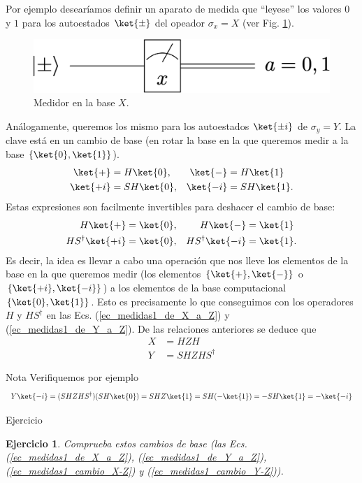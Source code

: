 \documentclass[a4paper,11pt]{book} %
\newtheorem{ejercicio_contador}{Ejercicio}
\newcommand{\Ejercicio}[1]{
		\begin{mybox_gray}{Ejercicio} 
			\begin{ejercicio_contador}
				 #1 
			\end{ejercicio_contador} 
		\end{mybox_gray}
	}
\numberwithin{equation}{chapter}
\def\lch{\left\{}
\def\rch{\right\}}
\begin{document}
Por ejemplo desearíamos definir un aparato de medida que ``leyese'' los valores $0$ y $1$ para los autoestados $\ket{\pm}$ del opeador $\sigma_x =  X$ (ver Fig. \ref{Fig_medidas1_meter_xbasis2}).
	\begin{figure}[H]
	\centering 
	\includegraphics[width=0.3\linewidth]{Figuras/Fig_medidas1_meter_xbasis2}
	\caption{Medidor en la base $X$.}
	\label{Fig_medidas1_meter_xbasis2}
	\end{figure}
Análogamente, queremos los mismo para los autoestados $\ket{\pm i}$ de $\sigma_y = Y$. La clave está en un cambio de base (en rotar la base en la que queremos medir a la base $\lch \ket{0}, \ket{1} \rch$). 
\begin{align}
\ket{+}  &= H\ket{0}  ,&  \ket{-}  &= H\ket{1}    \\ 
\ket{+i}  &= SH \ket{0}    ,&  \ket{-i}  &= SH\ket{1}   .
\end{align}
Estas expresiones son facilmente invertibles para deshacer el cambio de base:
\begin{align}
H \ket{+}  &= \ket{0}                ,&  H\ket{-}  & = \ket{1}   \label{ec_medidas1_de_X_a_Z} \\ 
H S^\dagger \ket{+i}  &=  \ket{0}    ,&  H S^\dagger  \ket{-i}  & = \ket{1}   . \label{ec_medidas1_de_Y_a_Z}
\end{align}
Es decir, la idea es llevar a cabo una operación que nos lleve los elementos de la base en la que queremos medir (los elementos $\{\ket{+},\ket{-} \}$ o  $\{\ket{+i},\ket{-i} \}$) a los elementos de la base computacional $\{\ket{0},\ket{1} \}$. Esto es precisamente lo que conseguimos con los operadores $H$ y $H S^\dagger$ en las Ecs. (\ref{ec_medidas1_de_X_a_Z}) y (\ref{ec_medidas1_de_Y_a_Z}).
De las relaciones anteriores se deduce que
\begin{align}
X & = H Z H   \label{ec_medidas1_cambio_X-Z} \\
Y & = S  H  Z   H S^\dagger \label{ec_medidas1_cambio_Y-Z}
\end{align}

	\begin{mybox_blue}{Nota}
	Verifiquemos por ejemplo
	$$
	Y \ket{-i} = (SHZHS^\dagger )(SH\ket{0}) = SH Z\ket{1} =  SH(-\ket{1})= - SH\ket{1} = -\ket{-i}
	$$
	\end{mybox_blue}

	\Ejercicio{
	Comprueba estos cambios de base (las Ecs. (\ref{ec_medidas1_de_X_a_Z}), (\ref{ec_medidas1_de_Y_a_Z}), (\ref{ec_medidas1_cambio_X-Z}) y (\ref{ec_medidas1_cambio_Y-Z})).
	}
	
\end{document}
